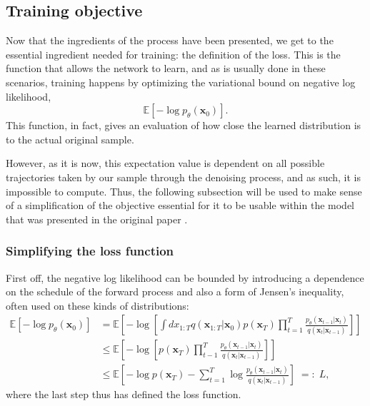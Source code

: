 \documentclass[a4paper, 12pt]{article}          %
\begin{document}
\subsection{Training objective}

Now that the ingredients of the process have been presented, we get to the essential ingredient needed for training: the definition of the loss. This is the function that allows the network to learn, and as is usually done in these scenarios, training happens by optimizing the variational bound on negative log likelihood,
\begin{equation}
    \mathbb{E} \left[ -\log p_\theta(\mathbf{x}_0) \right].
\end{equation}
This function, in fact, gives an evaluation of how close the learned distribution is to the actual original sample. 

However, as it is now, this expectation value is dependent on all possible trajectories taken by our sample through the denoising process, and as such, it is impossible to compute. Thus, the following subsection will be used to make sense of a simplification of the objective essential for it to be usable within the model that was presented in the original paper \cite{Ho2020}.

\subsubsection{Simplifying the loss function}
First off, the negative log likelihood can be bounded by introducing a dependence on the schedule of the forward process and also a form of Jensen's inequality, often used on these kinds of distributions:
\begin{equation} \begin{split}
    \mathbb{E} \left[ -\log p_\theta(\mathbf{x}_0) \right] &= \mathbb{E} \left[ -\log \left[ \int dx_{1:T} q(\mathbf{x}_{1:T}| \mathbf{x}_0)p(\mathbf{x}_T)\prod_{t=1}^T \frac{p_\theta(\mathbf{x}_{t-1} | \mathbf{x}_t)}{q(\mathbf{x}_t | \mathbf{x}_{t-1})}\right]\right]\\
    & \leq \mathbb{E} \left[ -\log \left[p(\mathbf{x}_T) \prod_{t-1}^T \frac{p_\theta(\mathbf{x}_{t-1}|\mathbf{x}_t)}{q(\mathbf{x}_t | \mathbf{x}_{t-1})}\right]\right] \\
    & \leq \mathbb{E} \left[ -\log p(\mathbf{x}_T) - \sum_{t=1}^T \log \frac{p_\theta(\mathbf{x}_{t-1} | \mathbf{x}_t)}{q(\mathbf{x}_t | \mathbf{x}_{t-1})} \right] \; =: \;  L,
\end{split} \end{equation}
where the last step thus has defined the loss function.
\end{document}
